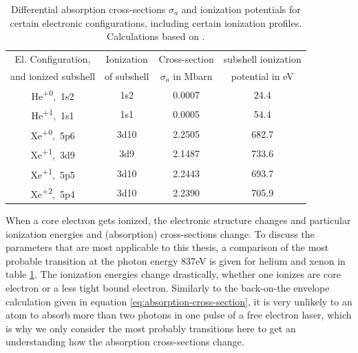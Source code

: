 \begin{table}
	\centering
		\begin{tabular}{ | c | c | c | c | }
		\hline
			El. Configuration, & Ionization & Cross-section  & subshell ionization  \\
			and ionized subshell & of subshell & $\sigma_{a}$ in Mbarn & potential in eV \\ \hline
			He\textsuperscript{+0},\ 1s2 & 1s2 & 0.0007 & 24.4 \\ \hline
			He\textsuperscript{+1},\ 1s1 & 1s1 & 0.0005 & 54.4 \\ \hline
			Xe\textsuperscript{+0},\ 5p6 & 3d10 & 2.2505 & 682.7 \\ \hline
			Xe\textsuperscript{+1},\ 3d9 & 3d9 & 2.1487 & 733.6 \\ \hline
			Xe\textsuperscript{+1},\ 5p5 & 3d10 & 2.2443 & 693.7 \\ \hline
			Xe\textsuperscript{+2},\ 5p4 & 3d10 & 2.2390 & 705.9 \\ \hline
		\end{tabular}
	\caption[Differential absorption cross-sections and ionization potentials for xenon and helium]{Differential absorption cross-sections $\sigma_{a}$ and ionization potentials for certain electronic configurations, including certain ionization profiles. Calculations based on \citep{Cowan-1981-Cal}.}
	\label{tab:helium-xenon-ionization}
\end{table}
When a core electron gets ionized, the electronic structure changes and particular ionization energies and (absorption) cross-sections change. To discuss the parameters that are most applicable to this thesis, a comparison of the most probable transition at the photon energy 837eV is given for helium and xenon in table \ref{tab:helium-xenon-ionization}. The ionization energies change drastically, whether one ionizes are core electron or a less tight bound electron. Similarly to the back-on-the envelope calculation given in equation \eqref{eq:absorption-cross-section}, it is very unlikely to an atom to absorb more than two photons in one pulse of a free electron laser, which is why we only consider the most probably transitions here to get an understanding how the absorption cross-sections change.\\
